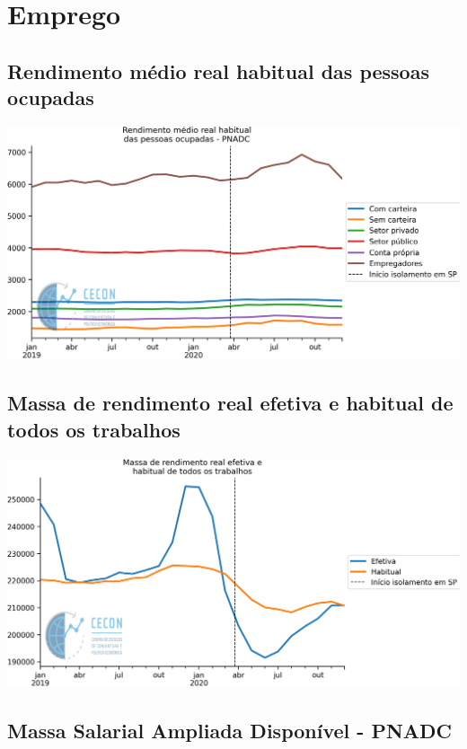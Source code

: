 \documentclass{SelfArx}
\begin{document}
\section*{Emprego}
\label{sec:org67cbbb3}

\subsection*{Rendimento médio real habitual das pessoas ocupadas}
\label{sec:orgad42c86}


\begin{center}
\includegraphics[width=.9\linewidth]{./figs/Emprego/RMHPO.png}
\end{center}

\subsection*{Massa de rendimento real efetiva e habitual de todos os trabalhos}
\label{sec:org04ecf99}

\begin{center}
\includegraphics[width=.9\linewidth]{./figs/Emprego/MRR_Efetiva_Habitual.png}
\end{center}

\subsection*{Massa Salarial Ampliada Disponível - PNADC}
\label{sec:orgf790e83}
\end{document}
